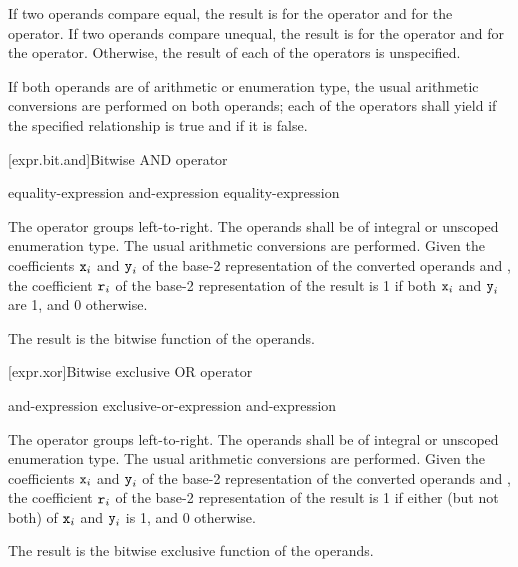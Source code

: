 \pnum
If two operands compare equal, the result is  for
the \tcode{==} operator and  for the \tcode{!=} operator. If two operands
compare unequal, the result is  for the \tcode{==} operator and
 for the \tcode{!=} operator. Otherwise, the result of each of the
operators is unspecified.

\pnum
If both operands are of arithmetic or enumeration type, the usual arithmetic
conversions are performed on both operands; each of the operators shall yield
 if the specified relationship is true and  if it is
false.

[expr.bit.and]{Bitwise AND operator}%
%
%
%
%

\begin{bnf}
\br
    equality-expression\br
    and-expression \terminal{\&} equality-expression
\end{bnf}

\pnum
The \tcode{\&} operator groups left-to-right.
The operands shall be of integral or unscoped enumeration type.
The usual arithmetic conversions are performed.
Given the coefficients $\texttt{\protect x}_i$ and $\texttt{\protect y}_i$
of the base-2 representation
of the converted operands  and ,
the coefficient $\texttt{\protect r}_i$
of the base-2 representation of the result 
is 1 if both $\texttt{\protect x}_i$ and $\texttt{\protect y}_i$ are 1, and 0 otherwise.
\begin{note}
The result is the bitwise  function of the operands.
\end{note}

[expr.xor]{Bitwise exclusive OR operator}%
%
%

\begin{bnf}
\br
    and-expression\br
    exclusive-or-expression \terminal{\caret} and-expression
\end{bnf}

\pnum
The \tcode{\caret} operator groups left-to-right.
The operands shall be of integral or unscoped enumeration type.
The usual arithmetic conversions are performed.
Given the coefficients $\texttt{\protect x}_i$ and $\texttt{\protect y}_i$
of the base-2 representation
of the converted operands  and ,
the coefficient $\texttt{\protect r}_i$
of the base-2 representation of the result 
is 1 if either (but not both) of $\texttt{\protect x}_i$ and $\texttt{\protect y}_i$ is 1,
and 0 otherwise.
\begin{note}
The result is the bitwise exclusive  function of the operands.
\end{note}

